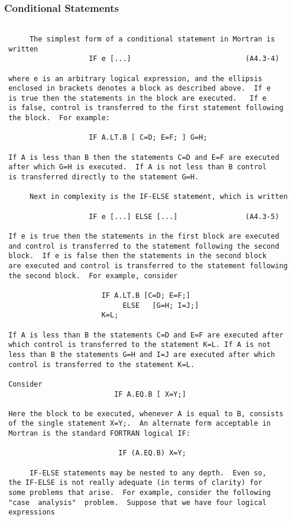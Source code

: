  \subsubsection{Conditional Statements}
 \begin{verbatim}

      The simplest form of a conditional statement in Mortran is
 written
                    IF e [...]                           (A4.3-4)

 where e is an arbitrary logical expression, and the ellipsis
 enclosed in brackets denotes a block as described above.  If e
 is true then the statements in the block are executed.   If e
 is false, control is transferred to the first statement following
 the block.  For example:

                    IF A.LT.B [ C=D; E=F; ] G=H;

 If A is less than B then the statements C=D and E=F are executed
 after which G=H is executed.  If A is not less than B control
 is transferred directly to the statement G=H.

      Next in complexity is the IF-ELSE statement, which is written

                    IF e [...] ELSE [...]                (A4.3-5)

 If e is true then the statements in the first block are executed
 and control is transferred to the statement following the second
 block.  If e is false then the statements in the second block
 are executed and control is transferred to the statement following
 the second block.  For example, consider

                       IF A.LT.B [C=D; E=F;]
                            ELSE   [G=H; I=J;]
                       K=L;

 If A is less than B the statements C=D and E=F are executed after
 which control is transferred to the statement K=L. If A is not
 less than B the statements G=H and I=J are executed after which
 control is transferred to the statement K=L.

 Consider
                          IF A.EQ.B [ X=Y;]

 Here the block to be executed, whenever A is equal to B, consists
 of the single statement X=Y;.  An alternate form acceptable in
 Mortran is the standard FORTRAN logical IF:

                           IF (A.EQ.B) X=Y;

      IF-ELSE statements may be nested to any depth.  Even so,
 the IF-ELSE is not really adequate (in terms of clarity) for
 some problems that arise.  For example, consider the following
 "case  analysis"  problem.  Suppose that we have four logical
 expressions


\end{verbatim}
